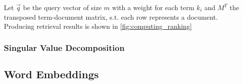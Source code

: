 Let $\vec{q}$ be the query vector of size $m$ with a weight for each term $k_i$ and $M^T$ the transposed term-document matrix, s.t. each row represents a document. Producing retrieval results is shown in \cref{fig:computing_ranking}

\subsubsection{Singular Value Decomposition}

\subsection{Word Embeddings}
